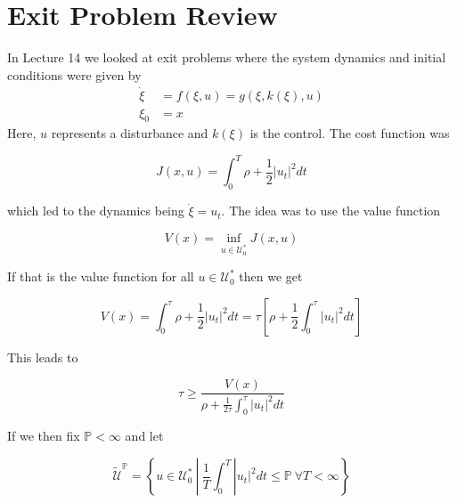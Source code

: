 \mainmatter%
\setcounter{page}{1}

\lectureseries[\course]{\course}

\date{November 19, 2009}

\setaddress%

\setcounter{lecture}{14}
\setcounter{chapter}{14}


\section{Exit Problem Review}
In Lecture 14 we looked at exit problems where the system dynamics and initial conditions were given by
\begin{align*}
\dot{\xi} &= f(\xi,u) = g(\xi,k(\xi),u) \\
\xi_0 &= x
\end{align*}
Here, $u$ represents a disturbance and $k(\xi)$ is the control.
The cost function was

\begin{equation*}
J(x,u) = \int_0^T\rho+\frac{1}{2}|u_t|^2dt
\end{equation*}

which led to the dynamics being $\dot{\xi}=u_t$.
The idea was to use the value function

\begin{equation*}
V(x) = \inf_{u\in\mathcal{U}_0^\ast}J(x,u)
\end{equation*}

If that is the value function for all $u\in\mathcal{U}_0^\ast$ then we get

\begin{equation*}
V(x) = \int_0^\tau \rho + \frac{1}{2}|u_t|^2dt = \tau\left[\rho+\frac{1}{2}\int_0^\tau|u_t|^2dt\right]
\end{equation*}

This leads to

\begin{equation*}
\tau\geq\frac{V(x)}{\rho+\frac{1}{2\tau}\int_0^\tau|u_t|^2dt}
\end{equation*}

If we then fix $\mathbb{P}<\infty$ and let

\begin{equation*}
\tilde{\mathcal{U}}^\mathbb{P} = \left\lbrace u\in\mathcal{U}_0^\ast~|~\frac{1}{T}\int_0^T|u_t|^2dt \leq \mathbb{P}~\forall T<\infty \right\rbrace
\end{equation*}

